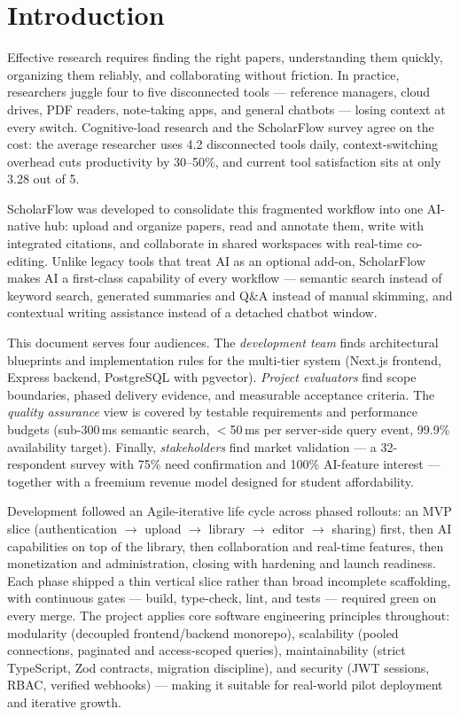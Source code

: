 \section{Introduction}
Effective research requires finding the right papers, understanding them
quickly, organizing them reliably, and collaborating without friction. In
practice, researchers juggle four to five disconnected tools --- reference
managers, cloud drives, PDF readers, note-taking apps, and general chatbots
--- losing context at every switch. Cognitive-load research and the
ScholarFlow survey agree on the cost: the average researcher uses 4.2
disconnected tools daily, context-switching overhead cuts productivity by
30--50\%, and current tool satisfaction sits at only 3.28 out of 5.

ScholarFlow was developed to consolidate this fragmented workflow into one
AI-native hub: upload and organize papers, read and annotate them, write with
integrated citations, and collaborate in shared workspaces with real-time
co-editing. Unlike legacy tools that treat AI as an optional add-on,
ScholarFlow makes AI a first-class capability of every workflow --- semantic
search instead of keyword search, generated summaries and Q\&A instead of
manual skimming, and contextual writing assistance instead of a detached
chatbot window.

This document serves four audiences. The \emph{development team} finds
architectural blueprints and implementation rules for the multi-tier system
(Next.js frontend, Express backend, PostgreSQL with pgvector). \emph{Project
evaluators} find scope boundaries, phased delivery evidence, and measurable
acceptance criteria. The \emph{quality assurance} view is covered by testable
requirements and performance budgets (sub-300\,ms semantic search, $<$50\,ms
per server-side query event, 99.9\% availability target). Finally,
\emph{stakeholders} find market validation --- a 32-respondent survey with
75\% need confirmation and 100\% AI-feature interest --- together with a
freemium revenue model designed for student affordability.

Development followed an Agile-iterative life cycle across phased rollouts:
an MVP slice (authentication $\rightarrow$ upload $\rightarrow$ library
$\rightarrow$ editor $\rightarrow$ sharing) first, then AI capabilities on
top of the library, then collaboration and real-time features, then
monetization and administration, closing with hardening and launch readiness.
Each phase shipped a thin vertical slice rather than broad incomplete
scaffolding, with continuous gates --- build, type-check, lint, and tests ---
required green on every merge. The project applies core software engineering
principles throughout: modularity (decoupled frontend/backend monorepo),
scalability (pooled connections, paginated and access-scoped queries),
maintainability (strict TypeScript, Zod contracts, migration discipline), and
security (JWT sessions, RBAC, verified webhooks) --- making it suitable for
real-world pilot deployment and iterative growth.
